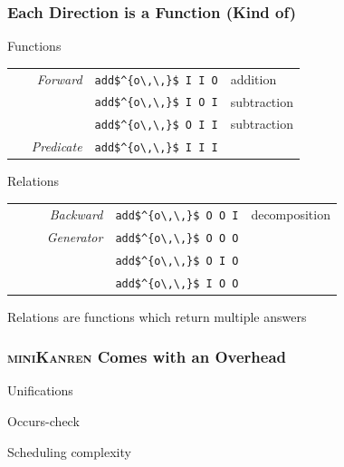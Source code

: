 \documentclass[xcolor=table, aspectratio=169]{beamer}
\newcommand{\makenote}[1]{\hfill \footnotesize{#1}}
\newcommand{\mk}{\textsc{miniKanren}\xspace}
\begin{document}
\begin{frame}[noframenumbering]
  \frametitle{Each Direction is a Function (Kind of)}
\begin{center}
Functions

\vfill

\begin{tabular}{rcl}
 ~~~ \emph{Forward} & \lstinline|add$^{o\,\,}$ I I O| & addition    \\
                    & \lstinline|add$^{o\,\,}$ I O I| & subtraction \\
                    & \lstinline|add$^{o\,\,}$ O I I| & subtraction \\
  \emph{Predicate}  & \lstinline|add$^{o\,\,}$ I I I| &
\end{tabular}
\end{center}

\vfill

\begin{center}
Relations

\vfill

\begin{tabular}{rcl}
 ~~~~~ \emph{Backward}  & \lstinline|add$^{o\,\,}$ O O I| & decomposition \\
       \emph{Generator} & \lstinline|add$^{o\,\,}$ O O O| &               \\
                        & \lstinline|add$^{o\,\,}$ O I O| &               \\
                        & \lstinline|add$^{o\,\,}$ I O O| &
\end{tabular}
\end{center}

\makenote{Relations are functions which return multiple answers}

\end{frame}

\begin{frame}[fragile]
  \frametitle{\mk Comes with an Overhead}
  \begin{center}
    Unifications
  \end{center}

  \begin{center}
    Occurs-check
  \end{center}

  \begin{center}
    Scheduling complexity
  \end{center}
\end{frame}
\end{document}
